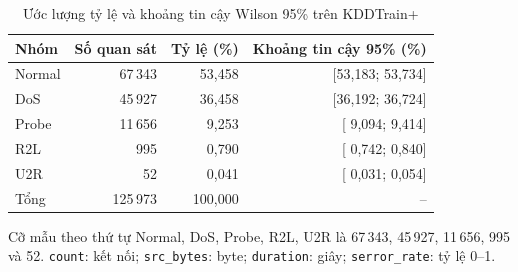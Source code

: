 \documentclass[../main.tex]{subfiles}
\begin{document}
\begin{table}[H]
\centering
\caption{Ước lượng tỷ lệ và khoảng tin cậy Wilson 95\% trên KDDTrain+}
\label{tab:t32:wilson}
\small
\setlength{\tabcolsep}{6pt}
\begin{tabular}{lrrr}
\toprule
Nhóm & Số quan sát & Tỷ lệ (\%) & Khoảng tin cậy 95\% (\%) \\
\midrule
Normal & 67\,343 & 53,458 & [53,183; 53,734] \\
DoS    & 45\,927 & 36,458 & [36,192; 36,724] \\
Probe  & 11\,656 &  9,253 & [ 9,094;  9,414] \\
R2L    &    995 &  0,790 & [ 0,742;  0,840] \\
U2R    &     52 &  0,041 & [ 0,031;  0,054] \\
\midrule
Tổng   & 125\,973 & 100,000 & -- \\
\bottomrule
\end{tabular}
\end{table}

\begin{table}[H]
\centering
\caption{Trung bình và trung vị theo nhóm trên thang gốc}
\label{tab:t33:descriptive}
\scriptsize
\setlength{\tabcolsep}{3pt}
\par\smallskip
\footnotesize Cỡ mẫu theo thứ tự Normal, DoS, Probe, R2L, U2R là 67\,343, 45\,927,
11\,656, 995 và 52. \texttt{count}: kết nối; \texttt{src\_bytes}: byte;
\texttt{duration}: giây; \texttt{serror\_rate}: tỷ lệ 0--1.
\end{table}
\end{document}
